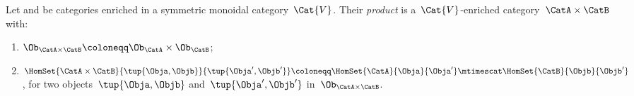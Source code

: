 \begin{widepar}
	\begin{center}
	\end{center}

	\begin{center}
	\end{center}
\end{widepar}

\begin{definition}
	\label{def:prod_enrich_cat}
	Let \CatA and \CatB be categories enriched in a symmetric monoidal category~$\Cat{V}$.
	Their \emph{product} is a~$\Cat{V}$-enriched category~$\CatA\times \CatB$ with:
	\begin{enumerate}
		\item $\Ob_{\CatA\times \CatB}\coloneqq \Ob_\CatA \times \Ob_\CatB$;
		\item $\HomSet{\CatA\times \CatB}{\tup{\Obja,\Objb}}{\tup{\Obja',\Objb'}}\coloneqq \HomSet{\CatA}{\Obja}{\Obja'}\mtimescat \HomSet{\CatB}{\Objb}{\Objb'}$, for two objects~$\tup{\Obja,\Objb}$ and~$\tup{\Obja',\Objb'}$ in~$\Ob_{\CatA\times \CatB}$.
	\end{enumerate}
\end{definition}


